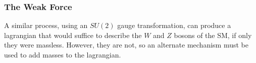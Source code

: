 








\subsubsection{The Weak Force}
\label{sec:ew}

A similar process, using an $SU(2)$ gauge transformation, can produce a lagrangian that would suffice to describe the $W$ and $Z$ bosons of the \ac{SM}, if only they were massless. However, they are not, so an alternate mechanism must be used to add masses to the lagrangian. 

